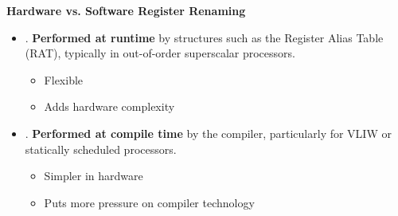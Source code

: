 \begin{flushleft}
    \textcolor{Green3}{ \textbf{Hardware vs. Software Register Renaming}}
\end{flushleft}
\begin{itemize}
    \item {}. \textbf{Performed at runtime} by structures such as the Register Alias Table (RAT), typically in out-of-order superscalar processors.
    \begin{itemize}
        \item[\textcolor{Green3}{\faIcon{check-circle}}] Flexible
        \item[\textcolor{Red2}{\faIcon{times-circle}}] Adds hardware complexity
    \end{itemize}
    
    
    \item {}. \textbf{Performed at compile time} by the compiler, particularly for VLIW or statically scheduled processors.
    \begin{itemize}
        \item[\textcolor{Green3}{\faIcon{check-circle}}] Simpler in hardware
        \item[\textcolor{Red2}{\faIcon{times-circle}}] Puts more pressure on compiler technology
    \end{itemize}
\end{itemize}